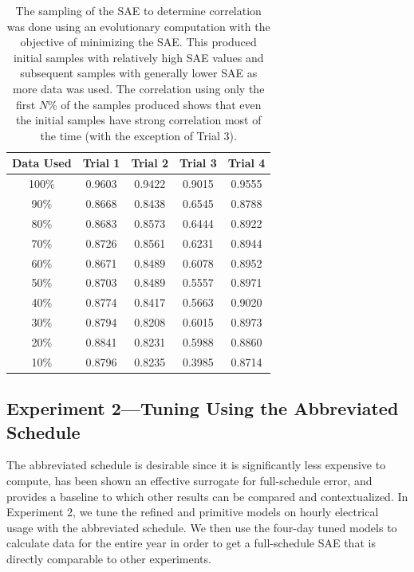 \documentclass[preprint, review, 12pt]{elsarticle}
\begin{document}
\begin{table}[tbp]
\centering
\caption{The sampling of the SAE to determine correlation was done using an evolutionary computation with the objective of minimizing the SAE. This produced initial samples with relatively high SAE values and subsequent samples with generally lower SAE as more data was used. The correlation using only the first $N$\% of the samples produced shows that even the initial samples have strong correlation most of the time (with the exception of Trial 3).}
\label{tab:hour-corr}
\begin{tabular}{ccccc}
\toprule
Data Used & Trial 1 & Trial 2 & Trial 3 & Trial 4\\
\midrule
100\% & 0.9603 & 0.9422 & 0.9015 & 0.9555\\\rowcolor{DarkRow}
90\%  & 0.8668 & 0.8438 & 0.6545 & 0.8788\\
80\%  & 0.8683 & 0.8573 & 0.6444 & 0.8922\\\rowcolor{DarkRow}
70\%  & 0.8726 & 0.8561 & 0.6231 & 0.8944\\
60\%  & 0.8671 & 0.8489 & 0.6078 & 0.8952\\\rowcolor{DarkRow}
50\%  & 0.8703 & 0.8489 & 0.5557 & 0.8971\\
40\%  & 0.8774 & 0.8417 & 0.5663 & 0.9020\\\rowcolor{DarkRow}
30\%  & 0.8794 & 0.8208 & 0.6015 & 0.8973\\
20\%  & 0.8841 & 0.8231 & 0.5988 & 0.8860\\\rowcolor{DarkRow}
10\%  & 0.8796 & 0.8235 & 0.3985 & 0.8714\\
\bottomrule
\end{tabular}
\end{table}


\subsection{Experiment 2---Tuning Using the Abbreviated Schedule}
\label{sub:experiment2}
The abbreviated schedule is desirable since it is significantly less expensive to compute, has been shown an effective surrogate for full-schedule error, and provides a baseline to which other results can be compared and contextualized. In Experiment 2, we tune the refined and primitive models on hourly electrical usage with the abbreviated schedule. We then use the four-day tuned models to calculate data for the entire year in order to get a full-schedule SAE that is directly comparable to other experiments.
\end{document}
